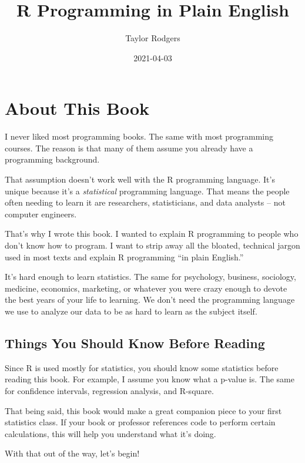 \documentclass[
]{book}
\title{R Programming in Plain English}
\author{Taylor Rodgers}
\date{2021-04-03}
\begin{document}
\maketitle

{
\setcounter{tocdepth}{1}
\tableofcontents
}
\hypertarget{about-this-book}{%
\chapter{About This Book}\label{about-this-book}}

I never liked most programming books. The same with most programming courses. The reason is that many of them assume you already have a programming background.

That assumption doesn't work well with the R programming language. It's unique because it's a \emph{statistical} programming language. That means the people often needing to learn it are researchers, statisticians, and data analysts -- not computer engineers.

That's why I wrote this book. I wanted to explain R programming to people who don't know how to program. I want to strip away all the bloated, technical jargon used in most texts and explain R programming ``in plain English.''

It's hard enough to learn statistics. The same for psychology, business, sociology, medicine, economics, marketing, or whatever you were crazy enough to devote the best years of your life to learning. We don't need the programming language we use to analyze our data to be as hard to learn as the subject itself.

\hypertarget{things-you-should-know-before-reading}{%
\section{Things You Should Know Before Reading}\label{things-you-should-know-before-reading}}

Since R is used mostly for statistics, you should know some statistics before reading this book. For example, I assume you know what a p-value is. The same for confidence intervals, regression analysis, and R-square.

That being said, this book would make a great companion piece to your first statistics class. If your book or professor references code to perform certain calculations, this will help you understand what it's doing.

With that out of the way, let's begin!
\end{document}
